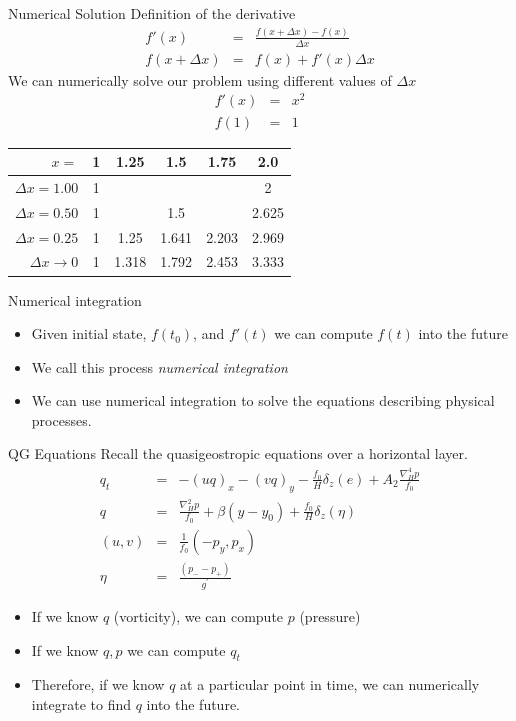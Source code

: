 \documentclass[a4paper]{beamer}
\begin{document}
\begin{frame}{Numerical Solution}
Definition of the derivative
\begin{eqnarray}
f'(x) & = & \frac{f(x+\Delta x) - f(x)}{\Delta x}\\
f(x + \Delta x) & = & f(x) + f'(x)\Delta x
\end{eqnarray}
We can numerically solve our problem using different values of $\Delta x$
\begin{eqnarray}
f'(x) & = & x^2\\
f(1) & = & 1
\end{eqnarray}

\begin{tabular}{|r|c|c|c|c|c|}
\hline
$x=$  & 1 & 1.25   & 1.5   & 1.75  & 2.0\\
\hline
\hline
$\Delta x=1.00$          & 1 &        &       &       & 2\\
\hline
$\Delta x=0.50$          & 1 &        & 1.5 &         & 2.625\\
\hline
$\Delta x=0.25$          & 1 & 1.25   & 1.641 & 2.203 & 2.969\\
\hline
$\Delta x \rightarrow 0$ & 1 & 1.318  & 1.792 & 2.453 & 3.333\\
\hline
\end{tabular}
\end{frame}

\begin{frame}{Numerical integration}
\begin{itemize}
\item Given initial state, $f(t_0)$, and $f'(t)$ we can compute $f(t)$ into the future
\item We call this process \emph{numerical integration}
\item We can use numerical integration to solve the equations describing physical processes.
\end{itemize}
\end{frame}

\begin{frame}{QG Equations}
Recall the quasigeostropic equations over a horizontal layer.
\begin{eqnarray}
q_t & = & - \left(uq\right)_x - \left(vq\right)_y  -\frac{f_0}{H}\delta_z(e)+ A_2\frac{\nabla^4_Hp}{f_0}\\
q &    =   & \frac{\nabla^2_Hp}{f_0} + \beta(y - y_0) + \frac{f_0}{H}\delta_z(\eta)\\
(u, v) & = & \frac{1}{f_0}(-p_y, p_x)\\
\eta & = & \frac{(p_- - p_+)}{g^\prime}
\end{eqnarray}
\begin{itemize}
\item If we know $q$ (vorticity), we can compute $p$ (pressure)\\
\item If we know $q, p$ we can compute $q_t$\\
\item Therefore, if we know $q$ at a particular point in time, we can numerically integrate to find $q$ into the future.
\end{itemize}
\end{frame}
\end{document}
